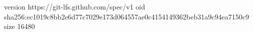 version https://git-lfs.github.com/spec/v1
oid sha256:ec1019c8bb2e6d77c7029e173d064557ae0c4154149362beb31a9c94ea7150c9
size 16480
